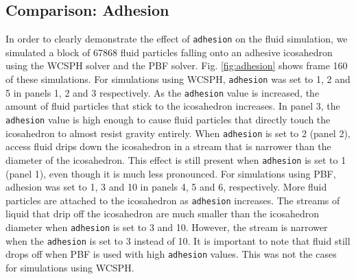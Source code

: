 \documentclass[11pt, letterpaper, twocolumn]{article}
\begin{document}
\subsection{Comparison: Adhesion}
\label{subsec:comparison_adhesion}

In order to clearly demonstrate the effect of \texttt{adhesion} on the fluid simulation, we simulated a block of 67868 fluid particles falling onto an adhesive icosahedron using the WCSPH solver and the PBF solver. Fig. \ref{fig:adhesion} shows frame 160 of these simulations. For simulations using WCSPH, \texttt{adhesion} was set to 1, 2 and 5 in panels 1, 2 and 3 respectively. As the 
\texttt{adhesion} value is increased, the amount of fluid particles that stick to the icosahedron increases. In panel 3, the \texttt{adhesion} value is high enough to cause fluid particles that directly touch the icosahedron to almost resist gravity entirely. When \texttt{adhesion} is set to 2 (panel 2), access fluid drips down the icosahedron in a stream
that is narrower than the diameter of the icosahedron. This effect is still present when \texttt{adhesion} is set to 1 (panel 1), even though it is much less pronounced. For simulations using PBF, adhesion was set to 1, 3 and 10 in panels 4, 5 and 6, respectively.
More fluid particles are attached to the icosahedron as \texttt{adhesion} increases.
The streams of liquid that drip off the icosahedron are much smaller than the icosahedron diameter when \texttt{adhesion} is set to 3 and 10. However, the stream is narrower when the \texttt{adhesion} is set to 3 instead of 10. It is important to note that fluid still drops off when PBF is used with high  \texttt{adhesion} values.
This was not the cases for simulations using WCSPH. 

\end{document}
